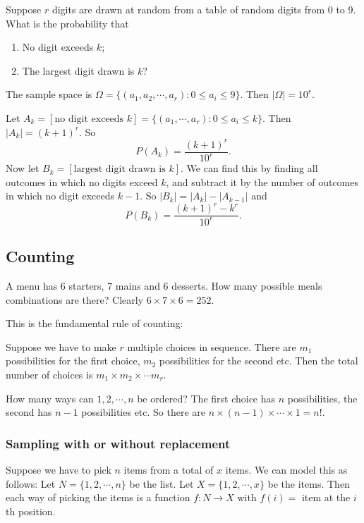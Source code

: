 \documentclass[a4paper]{article}
\begin{document}
\begin{eg}
  Suppose $r$ digits are drawn at random from a table of random digits from 0 to 9. What is the probability that
  \begin{enumerate}
    \item No digit exceeds $k$;
    \item The largest digit drawn is $k$?
  \end{enumerate}

  The sample space is $\Omega = \{(a_1, a_2, \cdots, a_r): 0 \leq a_i \leq 9\}$. Then $|\Omega| = 10^r$.

  Let $A_k = [\text{no digit exceeds }k] = \{(a_1, \cdots, a_r): 0 \leq a_i \leq k\}$. Then $|A_k| = (k + 1)^r$. So 
  \[
    P(A_k) = \frac{(k + 1)^r}{10^r}.
  \]
  Now let $B_k = [\text{largest digit drawn is }k]$. We can find this by finding all outcomes in which no digits exceed $k$, and subtract it by the number of outcomes in which no digit exceeds $k - 1$. So $|B_k| = |A_k| - |A_{k - 1}|$ and 
  \[
    P(B_k) = \frac{(k + 1)^r - k^r}{10^r}.
  \]
\end{eg}
\subsection{Counting}
\begin{eg}
  A menu has 6 starters, 7 mains and 6 desserts. How many possible meals combinations are there? Clearly $6 \times 7 \times 6 = 252$.
\end{eg}
This is the fundamental rule of counting:
\begin{thm}
  Suppose we have to make $r$ multiple choices in sequence. There are $m_1$ possibilities for the first choice, $m_2$ possibilities for the second etc. Then the total number of choices is $m_1\times m_2\times \cdots m_r$.
\end{thm}

\begin{eg}
  How many ways can $1, 2, \cdots, n$ be ordered? The first choice has $n$ possibilities, the second has $n - 1$ possibilities etc. So there are $n\times (n - 1)\times\cdots \times 1 = n!$.
\end{eg}

\subsubsection*{Sampling with or without replacement}
Suppose we have to pick $n$ items from a total of $x$ items. We can model this as follows: Let $N = \{1, 2, \cdots, n\}$ be the list. Let $X = \{1, 2, \cdots, x\}$ be the items. Then each way of picking the items is a function $f: N\to X$ with $f(i) =$ item at the $i$th position.
\end{document}
